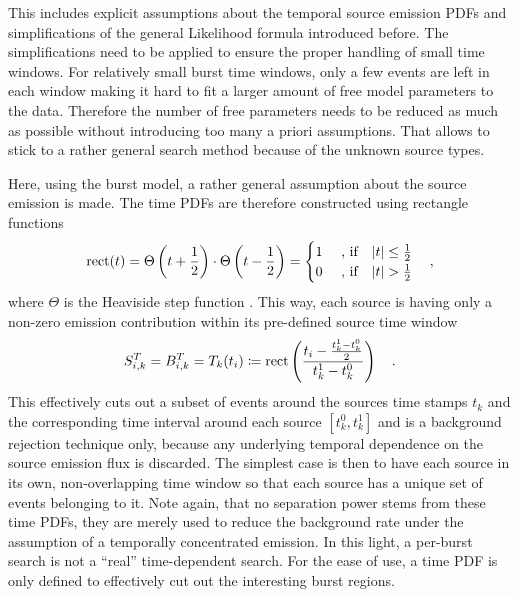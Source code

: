 This includes explicit assumptions about the temporal source emission PDFs and simplifications of the general Likelihood formula introduced before.
The simplifications need to be applied to ensure the proper handling of small time windows.
For relatively small burst time windows, only a few events are left in each window making it hard to fit a larger amount of free model parameters to the data.
Therefore the number of free parameters needs to be reduced as much as possible without introducing too many a priori assumptions.
That allows to stick to a rather general search method because of the unknown source types.

Here, using the burst model, a rather general assumption about the source emission is made.
The time PDFs are therefore constructed using rectangle functions
\begin{equation}
  \operatorname{rect}(t)
  = \Theta\left(t+\frac{1}{2}\right) \cdot \Theta\left(t-\frac{1}{2}\right)
  = \begin{cases}
      1 &\text{ , if}\quad |t| \leq \frac{1}{2} \\
      0 &\text{ , if}\quad |t|   >  \frac{1}{2} \\
    \end{cases}
  \quad\text{,}
\end{equation}
where $\Theta$ is the Heaviside step function \cite{Abramowitz:1974handbook}.
This way, each source is having only a non-zero emission contribution within its pre-defined source time window
\begin{equation}
  \label{equ:time_window_def}
  S_{i,k}^T = B_{i,k}^T = T_k(t_i) \coloneqq
    \operatorname{rect}\left(\frac{t_i - \frac{t_k^1-t_k^0}{2}}
                              {t_k^1-t_k^0}\right)
  \quad\text{.}
\end{equation}
This effectively cuts out a subset of events around the sources time stamps $t_k$ and the corresponding time interval around each source $[t_k^0, t_k^1]$ and is a background rejection technique only, because any underlying temporal dependence on the source emission flux is discarded.
The simplest case is then to have each source in its own, non-overlapping time window so that each source has a unique set of events belonging to it.
Note again, that no separation power stems from these time PDFs, they are merely used to reduce the background rate under the assumption of a temporally concentrated emission.
In this light, a per-burst search is not a \enquote{real} time-dependent search.
For the ease of use, a time PDF is only defined to effectively cut out the interesting burst regions.

